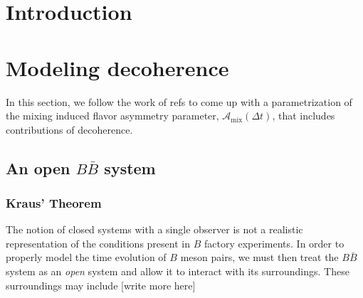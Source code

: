
\chapter{Introduction}



\chapter{Modeling decoherence}

In this section, we follow the work of refs \cite{ALOK, Naikoo} to come up with a parametrization of the mixing induced flavor asymmetry parameter, $\mathcal{A}_\text{mix}(\Delta t)$, that includes contributions of decoherence.

\section{An open $B\bar{B}$ system}

\subsection{Kraus' Theorem}

The notion of closed systems with a single observer is not a realistic representation of the conditions present in $B$ factory experiments. In order to properly model the time evolution of $B$ meson pairs, we must then treat the $B\bar{B}$ system as an \textit{open} system and allow it to interact with its surroundings. These surroundings may include [write more here]

